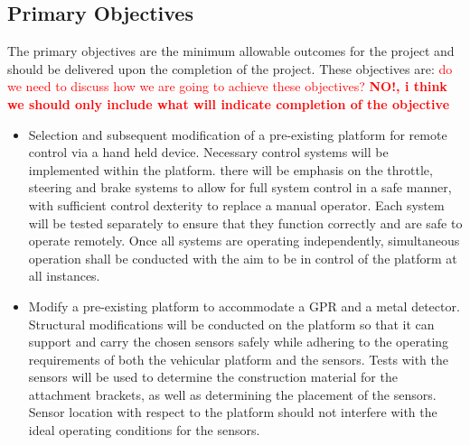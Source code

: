 \documentclass[main.tex]{subfiles}
\begin{document}
 
\subsection{Primary Objectives}
The primary objectives are the minimum allowable outcomes for the project and should be delivered upon the completion of the project. These objectives are:
\textcolor{red}{do we need to discuss how we are going to achieve these objectives? \textbf{NO!, i think we should only include what will indicate completion of the objective}}
\begin{itemize}
\item Selection and subsequent modification of a pre-existing platform for remote control via a hand held device. Necessary control systems will be implemented within the platform. there will be emphasis on the throttle, steering and brake systems to allow for full system control in a safe manner, with sufficient control dexterity to replace a manual operator. Each system will be tested separately to ensure that they function correctly and are safe to operate remotely. Once all systems are operating independently, simultaneous operation shall be conducted with the aim to be in control of the platform at all instances. %

\item Modify a pre-existing platform to accommodate a GPR and a metal detector. Structural modifications will be conducted on the platform so that it can support and carry the chosen sensors safely while adhering to the operating requirements of both the vehicular platform and the sensors. %
Tests with the sensors will be used to determine the construction material for the attachment brackets, as well as determining the placement of the sensors. Sensor location with respect to the platform should not interfere with the ideal operating conditions for the sensors.


\end{itemize}
\end{document}
